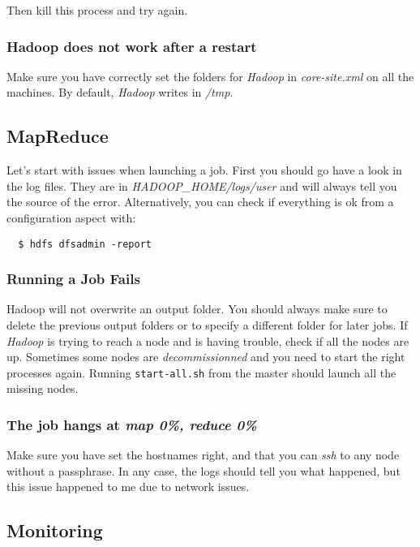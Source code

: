 \documentclass[a4paper, 12pt]{article}
\begin{document}
Then kill this process and try again.

    \subsubsection*{Hadoop does not work after a restart}
    
Make sure you have correctly set the folders for \textit{Hadoop} in \textit{core-site.xml} on all the machines. By default, \textit{Hadoop} writes in \textit{/tmp}.

  \subsection{MapReduce}

Let's start with issues when launching a job. First you should go have a look in the log files. They are in \textit{HADOOP\_HOME/logs/user} and will always tell you the source of the error. Alternatively, you can check if everything is ok from a configuration aspect with:

\begin{verbatim}
  $ hdfs dfsadmin -report
\end{verbatim}
  
    \subsubsection*{Running a Job Fails}

Hadoop will not overwrite an output folder. You should always make sure to delete the previous output folders or to specify a different folder for later jobs. If \textit{Hadoop} is trying to reach a node and is having trouble, check if all the nodes are up. Sometimes some nodes are \textit{decommissionned} and you need to start the right processes again. Running \texttt{start-all.sh} from the master should launch all the missing nodes.
   
    \subsubsection*{The job hangs at \textit{map 0\%, reduce 0\%}}

Make sure you have set the hostnames right, and that you can \textit{ssh} to any node without a passphrase. In any case, the logs should tell you what happened, but this issue happened to me due to network issues.
    
  \subsection{Monitoring}
  
\end{document}
